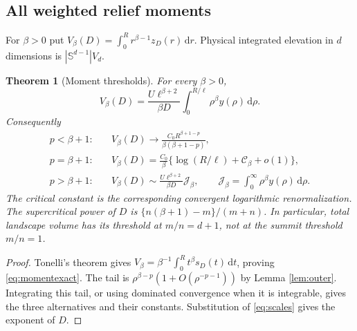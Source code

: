 \documentclass[11pt,a4paper]{article}
\newtheorem{theorem}{Theorem}[section]
\theoremstyle{definition}\newtheorem{definition}[theorem]{Definition}
\theoremstyle{remark}\newtheorem{remark}[theorem]{Remark}
\newcommand{\dd}{\,\mathrm d}
\begin{document}
\subsection{All weighted relief moments}
For $\beta>0$ put $V_\beta(D)=\int_0^R r^{\beta-1}z_D(r)\dd r$. Physical integrated elevation in $d$ dimensions is $|\mathbb S^{d-1}|V_d$.

\begin{theorem}[Moment thresholds]\label{thm:moments}
For every $\beta>0$,
\begin{equation}
 V_\beta(D)=\frac{U\ell^{\beta+2}}{\beta D}
       \int_0^{R/\ell}\rho^\beta y(\rho)\dd\rho.\label{eq:momentexact}
\end{equation}
Consequently
\begin{align*}
 p<\beta+1:\quad&V_\beta(D)\to
       \frac{C_0R^{\beta+1-p}}{\beta(\beta+1-p)},\\
 p=\beta+1:\quad&V_\beta(D)=\frac{C_0}{\beta}
       \{\log(R/\ell)+\mathcal C_\beta+o(1)\},\\
 p>\beta+1:\quad&V_\beta(D)\sim
       \frac{U\ell^{\beta+2}}{\beta D}\mathcal J_\beta,
 \qquad\mathcal J_\beta=\int_0^\infty\rho^\beta y(\rho)\dd\rho.
\end{align*}
The critical constant is the corresponding convergent logarithmic renormalization. The supercritical power of $D$ is $\{n(\beta+1)-m\}/(m+n)$. In particular, total landscape volume has its threshold at $m/n=d+1$, not at the summit threshold $m/n=1$.
\end{theorem}
\begin{proof}
Tonelli's theorem gives $V_\beta=\beta^{-1}\int_0^R t^\beta s_D(t)\dd t$, proving \eqref{eq:momentexact}. The tail is $\rho^{\beta-p}(1+O(\rho^{-p-1}))$ by Lemma \ref{lem:outer}. Integrating this tail, or using dominated convergence when it is integrable, gives the three alternatives and their constants. Substitution of \eqref{eq:scales} gives the exponent of $D$.
\end{proof}
\end{document}
